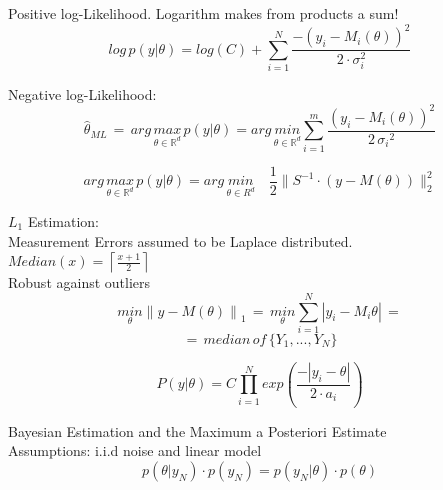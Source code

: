 Positive log-Likelihood. Logarithm makes from products a sum!
\begin{equation*}
{ log \, p(y|\theta ) } = log(C) +\sum _{ i=1 }^{ N }{ { \frac { -(y_{ i }-M_{ i }(\theta ))^{ 2 } }{ 2 \cdot \sigma _{ i }^{ 2 } }  } } 
\end{equation*}

Negative log-Likelihood:
\begin{equation*}
\hat{\theta}_{ML} \, = \, arg \, \underset { \theta \in { \mathbb{R} }^{ d } }{ max } \, p(y|\theta ) = arg \, \underset { \theta \in { \mathbb{R} }^{ d } }{ min }  \sum _{ i=1 }^{ m }{ \frac { (y_{ i }-M_{ i }(\theta ))^{ 2 } }{ 2\, { \sigma _{ i } }^{ 2 } }  } 
\end{equation*}

\begin{equation*}
arg \, \underset{ \theta \in \mathbb{ R }^{ d } }{ max } \, p(y|\theta ) = arg \, \underset { \theta \in {  R }^{ d } }{ min } \quad \frac{1}{2} \parallel S^{ -1 }\cdot (y-M(\theta )){ \parallel  }_{ 2 }^{ 2 }
\end{equation*}

\({L}_{1}\) Estimation:\\
Measurement Errors assumed to be Laplace distributed.\\ \(Median(x)=\left\lceil \frac { x + 1 }{ 2 }  \right\rceil \)\\
Robust against outliers
\begin{equation*}
\underset { \theta  }{ min } { \parallel y-M(\theta )\parallel  }_{ 1 }\,=\,\underset { \theta  }{ min } \sum _{ i=1 }^{ N }{ |{ y }_{ i }-{ M }_{ i }\theta | } \,=
\end{equation*}
\begin{equation*}
=\,median\,of\,\{{Y}_{1},...,{Y}_{N}\}
\end{equation*}



\begin{equation*}
{ P(y|\theta ) }=C\prod _{ i=1 }^{ N }{ { exp }(\frac { -|{ y }_{ i }-\theta | }{ 2\cdot { a }_{ i } } ) } 
\end{equation*} 

Bayesian Estimation and the Maximum a Posteriori Estimate\\
Assumptions: i.i.d noise and linear model
\begin{equation*}
p(\theta |{ y }_{ N })\cdot p({ y }_{ N })=p({ y }_{ N }|\theta )\cdot p(\theta)
\end{equation*}

